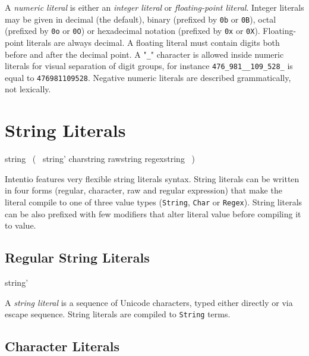 A \emph{numeric literal} is either an \emph{integer literal} or \emph{floating-point   literal}. Integer literals may be given in decimal (the default), binary (prefixed by \texttt{0b} or \texttt{0B}), octal (prefixed by \texttt{0o} or \texttt{0O}) or hexadecimal notation (prefixed by \texttt{0x} or \texttt{0X}). Floating-point literals are always decimal. A floating literal must contain digits both before and after the decimal point. A "\texttt{\_}" character is allowed inside numeric literals for visual separation of digit groups, for instance \lstinline{476_981__109_528_} is equal to \lstinline{476981109528}. Negative numeric literals are described grammatically, not lexically.

\section{String Literals}

\begin{bnf}
  string \eq {} \ ( \ string' \gor charstring \gor rawstring \gor regexstring \ )
\end{bnf}

Intentio features very flexible string literals syntax. String literals can be written in four forms (regular, character, raw and regular expression) that make the literal compile to one of three value types (\lstinline{String}, \lstinline{Char} or \lstinline{Regex}). String literals can be also prefixed with few modifiers that alter literal value before compiling it to value.

\subsection*{Regular String Literals}

\begin{bnf}
  string' \eq {} \  \ 
\end{bnf}

A \emph{string literal} is a sequence of Unicode characters, typed either directly or via escape sequence. String literals are compiled to \lstinline{String} terms.

\subsection*{Character Literals}

